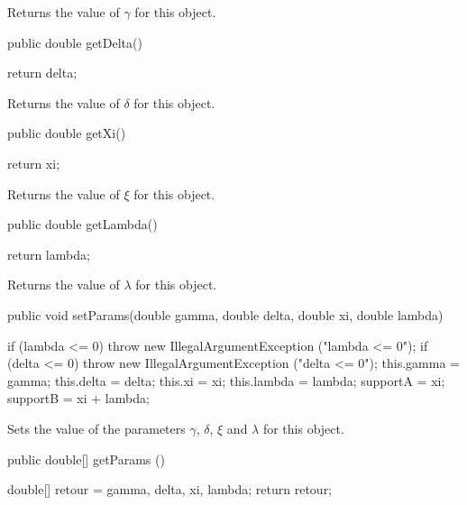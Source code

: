   \begin{tabb}
  Returns the value of $\gamma$ for this object.
 \end{tabb}
\begin{code}      

   public double getDelta()\begin{hide} {
      return delta;
   }\end{hide}
\end{code}
  \begin{tabb}
  Returns the value of $\delta$ for this object.
 \end{tabb}
\begin{code}      

   public double getXi()\begin{hide} {
      return xi;
   }\end{hide}
\end{code}
  \begin{tabb}
  Returns the value of $\xi$ for this object.
 \end{tabb}
\begin{code}      

   public double getLambda()\begin{hide} {
      return lambda;
   }
\end{hide}
\end{code}
  \begin{tabb}
  Returns the value of $\lambda$ for this object.
 \end{tabb}
\begin{code}      

   public void setParams(double gamma, double delta, double xi,
                         double lambda)\begin{hide} {
      if (lambda <= 0)
         throw new IllegalArgumentException ("lambda <= 0");
      if (delta <= 0)
         throw new IllegalArgumentException ("delta <= 0");
      this.gamma = gamma;
      this.delta = delta;
      this.xi = xi;
      this.lambda = lambda;
      supportA = xi;
      supportB = xi + lambda;
   }\end{hide}
\end{code}
  \begin{tabb}
  Sets the value of the parameters $\gamma$, $\delta$, $\xi$ and
  $\lambda$ for this object.
 \end{tabb}
 \begin{code}

   public double[] getParams ()\begin{hide} {
      double[] retour = {gamma, delta, xi, lambda};
      return retour;
   }\end{hide}
\end{code}
